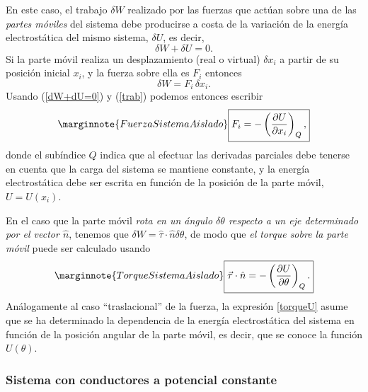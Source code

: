 En este caso, el trabajo $\delta W$ realizado por las fuerzas que actúan sobre una de
las \textit{partes móviles} del sistema debe producirse a costa de la
variación de la energía electrostática del mismo sistema, $\delta U$, es decir,
\begin{equation}
 \delta W + \delta U=0. \label{dW+dU=0}
\end{equation}
Si la parte móvil realiza un desplazamiento (real o virtual) $\delta x_i$ a
partir de su posición inicial $x_i$, y la fuerza sobre ella es $F_i$ entonces
\begin{equation}
 \delta W=F_i\,\delta x_i. \label{trab}
\end{equation}
Usando (\ref{dW+dU=0}) y (\ref{trab}) podemos entonces escribir
\begin{equation}\marginnote{Fuerza Sistema Aislado}
\boxed{F_i=-\left(\frac{\partial U}{\partial x_i}\right)_Q ,} \label{FQ}
\end{equation}
donde el subíndice $Q$ indica que al efectuar las derivadas parciales debe
tenerse en cuenta que la carga del sistema se mantiene constante, y la energía
electrostática debe ser escrita en función de la posición de la parte
móvil, $U=U(x_i)$.

En el caso que la parte móvil \textit{rota en un ángulo $\delta\theta$ respecto a un eje determinado por el vector $\hat{n}$}, tenemos que $\delta W=\hat{\tau}\cdot\hat{n}\delta\theta$, de modo que \textit{el torque
sobre la parte móvil} puede ser calculado usando
\begin{equation}\label{torqueU}\marginnote{Torque Sistema Aislado}
 \boxed{\vec{\tau}\cdot\hat{n}=-\left(\frac{\partial U}{\partial\theta}\right)_Q
.}
\end{equation}
Análogamente al caso ``traslacional'' de la fuerza, la expresión \eqref{torqueU} asume que se ha determinado la dependencia de la energía electrostática del sistema en función de la posición angular de la parte móvil, es decir, que se conoce la función $U(\theta)$.


\subsubsection{Sistema con conductores a potencial constante}

